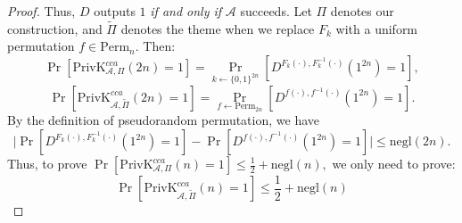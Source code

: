 \documentclass[12pt]{article}
\newcommand{\privk}{\text{PrivK}}
\newcommand{\negl}{\text{negl}}
\newcommand{\Perm}{\text{Perm}}
\newcommand{\A}{\mathcal{A}}
\newenvironment{problem}[2][Problem]{\begin{trivlist}
\item[\hskip \labelsep {\bfseries #1}\hskip \labelsep {\bfseries #2.}]}{\end{trivlist}}
\begin{document}
\begin{problem}{4.25}
\begin{proof}
Thus, $D$ outputs $1$ \textit{if and only if} $\A$ succeeds. Let $\Pi$ denotes our construction, and $\widetilde{\Pi}$ denotes the theme when we replace $F_k$ with a uniform permutation $f\in\Perm_n$. Then:
\[\Pr[\privk_{\A,\Pi}^{cca}(2n)=1]=\Pr_{k\leftarrow\{0,1\}^{2n}}[D^{F_k(\cdot),F_k^{-1}(\cdot)}(1^{2n})=1],\]
\[\Pr[\privk_{\A,\widetilde{\Pi}}^{cca}(2n)=1]=\Pr_{f\leftarrow\Perm_{2n}}[D^{f(\cdot),f^{-1}(\cdot)}(1^{2n})=1].\]
By the definition of pseudorandom permutation, we have 
\[\mid\Pr[D^{F_k(\cdot),F_k^{-1}(\cdot)}(1^{2n})=1]-\Pr[D^{f(\cdot),f^{-1}(\cdot)}(1^{2n})=1]\mid\le\negl(2n).\]
Thus, to prove $\Pr[\privk_{\A,\Pi}^{cca}(n)=1]\le\frac12+\negl(n),$ we only need to prove:\[\Pr[\privk_{\A,\widetilde{\Pi}}^{cca}(n)=1]\le\frac12+\negl(n)\]\par
\vspace{3ex}


\end{proof}
\end{problem}
\end{document}
